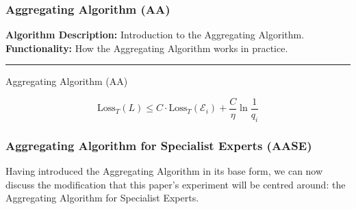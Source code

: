 \subsubsection{Aggregating Algorithm (AA)}
\textbf{Algorithm Description:} Introduction to the Aggregating Algorithm.\newline
\textbf{Functionality:} How the Aggregating Algorithm works in practice.\newline
\noindent\rule{\textwidth}{0.1pt}
\begin{algorithm}[H]
    \caption{Aggregating Algorithm (AA)}\label{alg:cap}
    \begin{algorithmic}[1]
    \end{algorithmic}
\end{algorithm}

\begin{equation}
    \text{Loss}_T(L) \leq C \cdot \text{Loss}_T(\mathcal{E}_i) + \frac{C}{\eta}\ln\frac{1}{q_i}
\end{equation}

\subsubsection{Aggregating Algorithm for Specialist Experts (AASE)}
\noindent Having introduced the Aggregating Algorithm in its base form, we can now discuss the modification that this paper's experiment will be centred around: the Aggregating Algorithm for Specialist Experts.

